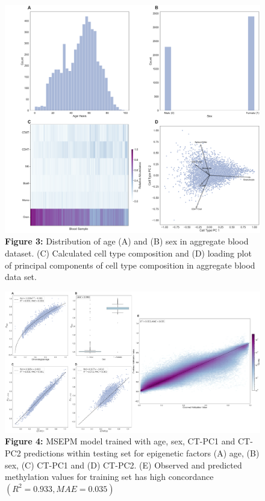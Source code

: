 \documentclass{article}
\begin{document}
{\begin{center}
    \begin{figure}
    \includegraphics[scale=.2]{Figures/Figure3.png}
    \footnotesize
    \caption*{\small \textbf{Figure 3:} Distribution of age (A) and (B) sex in aggregate blood dataset. (C) Calculated cell type composition and (D) loading plot of
 principal components of cell type composition in aggregate blood data set.}
    \end{figure}
\end{center}

\begin{raggedleft}
\begin{figure}
\includegraphics[scale=.15]{Figures/Figure4.png}
\footnotesize
\caption*{\small \textbf{Figure 4:} MSEPM model trained with age, sex, CT-PC1 and CT-PC2 predictions within testing 
set for epigenetic factors (A) age, (B) sex, (C) CT-PC1 and (D) CT-PC2. (E) Observed and predicted
 methylation values for training set has high concordance $(R^2=0.933, MAE=0.035)$}
\end{figure}
\end{raggedleft}

}
\end{document}
